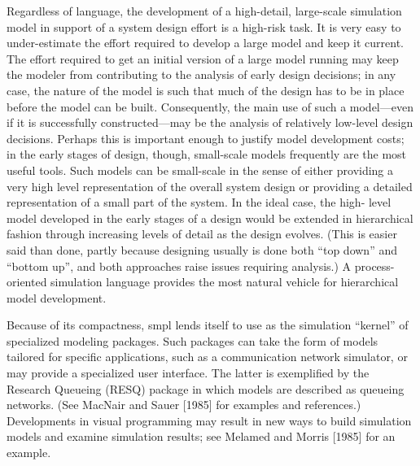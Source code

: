 Regardless of language, the development of a high-detail, large-scale
simulation model in support of a system design effort is a high-risk task. It
is very easy to under-estimate the effort required to develop a large model
and keep it current. The effort required to get an initial version of a large
model running may keep the modeler from contributing to the analysis of
early design decisions; in any case, the nature of the model is such that much
of the design has to be in place before the model can be built. Consequently,
the main use of such a model---even if it is successfully constructed---may be
the analysis of relatively low-level design decisions. Perhaps this is
important enough to justify model development costs; in the early stages of
design, though, small-scale models frequently are the most useful tools. Such
models can be small-scale in the sense of either providing a very high level
representation of the overall system design or providing a detailed
representation of a small part of the system. In the ideal case, the high-
level model developed in the early stages of a design would be extended in
hierarchical fashion through increasing levels of detail as the design
evolves. (This is easier said than done, partly because designing usually is
done both ``top down'' and ``bottom up'', and both approaches raise issues
requiring analysis.) A process-oriented simulation language provides the
most natural vehicle for hierarchical model development.

Because of its compactness, smpl lends itself to use as the simulation
``kernel'' of specialized modeling packages. Such packages can take the form
of models tailored for specific applications, such as a communication network
simulator, or may provide a specialized user interface. The latter is exemplified
by the Research Queueing (RESQ) package in which models are
described as queueing networks. (See MacNair and Sauer [1985] for examples
and references.) Developments in visual programming may result in new
ways to build simulation models and examine simulation results; see
Melamed and Morris [1985] for an example.
